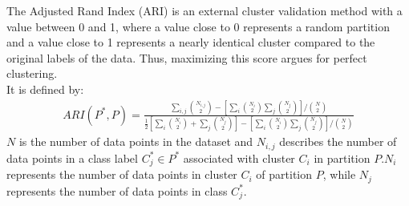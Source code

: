 The Adjusted Rand Index (ARI) is an external cluster validation method with a value between 0 and 1, where a value close to 0 represents a random partition and a value close to 1 represents a nearly identical cluster compared to the original labels of the data. Thus, maximizing this score argues for perfect clustering.\\
It is defined by: \cite{ari}
\begin{align}
    ARI(P^*,P) = \frac{\sum_{i,j}\binom{N_{i,j}}{2}-[\sum_{i}\binom{N_{i}}{2}\sum_{j}\binom{N_{j}}{2}]/\binom{N}{2}}{\frac{1}{2}[\sum_{i}\binom{N_{i}}{2}+\sum_{j}\binom{N_{j}}{2}]-[\sum_{i}\binom{N_{i}}{2}\sum_{j}\binom{N_{j}}{2}]/\binom{N}{2}}
\end{align}
$N$ is the number of data points in the dataset and $N_{i,j}$ describes the number of data points in a class label $C_j^* \in P^*$ associated with cluster $C_i$ in partition $P$.$N_i$ represents the number of data points in cluster $C_i$ of partition $P$, while $N_j$ represents the number of data points in class $C_j^*$. \cite{ari}